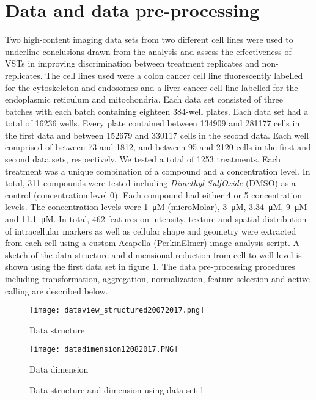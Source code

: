 \documentclass[11pt]{article}
\begin{document}
\clearpage
\section{Data and data pre-processing}\label{data}
\par{Two high-content imaging data sets from two different cell lines were used to underline conclusions drawn from the analysis and assess the effectiveness of VSTs in improving discrimination between treatment replicates and non-replicates. The cell lines used were a colon cancer cell line fluorescently labelled for the cytoskeleton and endosomes and a liver cancer cell line labelled for the endoplasmic reticulum and mitochondria. Each data set consisted of three batches with each batch containing eighteen 384-well plates. Each data set had a total of 16236 wells. Every plate contained between 134909 and 281177 cells in the first data and between 152679 and 330117 cells in the second data. Each well comprised of between 73 and 1812, and between  95 and 2120 cells in the first and second data sets, respectively. We tested a total of 1253 treatments. Each treatment was a unique combination of a compound and a concentration level. In total, 311 compounds were tested including \textit{Dimethyl SulfOxide} (DMSO) as a control (concentration level 0). Each compound had either 4 or 5 concentration levels. The concentration levels were \SI{1}{\micro M} (microMolar), \SI{3}{\micro M}, \SI{3.34}{\micro M}, \SI{9}{\micro M} and \SI{11.1}{\micro M}. In total, 462 features on intensity, texture and spatial distribution of intracellular markers as well as cellular shape and geometry were extracted from each cell using a custom Acapella (PerkinElmer) image analysis script. A sketch of the data structure and dimensional reduction from cell to well level is shown using the first data set in figure \ref{datasd}. The data pre-processing procedures including transformation, aggregation, normalization, feature selection and active calling are described below. 
% 
% 

\begin{figure}
\centering
\begin{minipage}{.5\textwidth}
\centering
\texttt{[image: dataview\_structured20072017.png]}
\caption*{Data structure}
\end{minipage}%
\begin{minipage}{.5\textwidth}
\centering
\texttt{[image: datadimension12082017.PNG]}
\caption*{Data dimension}
\end{minipage}
\caption{Data structure and dimension using data set 1}
\label{datasd}
\end{figure}
}
\end{document}
